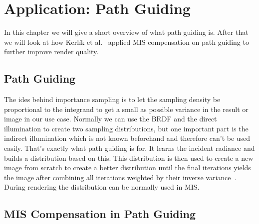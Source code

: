 \chapter{Application: Path Guiding}
\label{ch:application_pg}
In this chapter we will give a short overview of what path guiding is.
After that we will look at how Kerl\'ik et al.~\cite{Karlik2019} applied MIS compensation on path guiding to further improve render quality.


\section{Path Guiding}
\label{sec:path_guiding}
The ides behind importance sampling is to let the sampling density be proportional to the integrand
to get a small as possible variance in the result or image in our use case.
Normally we can use the BRDF and the direct illumination to create two sampling distributions,
but one important part is the indirect illumination which is not known beforehand and therefore can't be used easily.
That's exactly what path guiding is for.
It learns the incident radiance and builds a distribution based on this.
This distribution is then used to create a new image from scratch to create a better distribution
until the final iterations yields the image after combining all iterations weighted by their inverse variance~\cite{Vorba_2019}.
During rendering the distribution can be normally used in MIS.


\section{MIS Compensation in Path Guiding}
\label{sec:misc_path_guiding}
